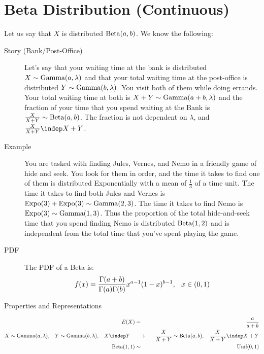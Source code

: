 \documentclass[11pt]{article}
\begin{document}
\section*{Beta Distribution (Continuous)}
\begin{description}
\item Let us say that $X$ is distributed $\textrm{Beta}(a, b)$. We know the following:
\begin{description}
  \item[Story (Bank/Post-Office)] Let's say that your waiting time at the bank is distributed $X \sim \textrm{Gamma}(a, \lambda)$ and that your total waiting time at the post-office is distributed $Y \sim \textrm{Gamma}(b, \lambda)$. You visit both of them while doing errands. Your total waiting time at both is $X + Y \sim \textrm{Gamma}(a + b, \lambda)$ and the fraction of your time that you spend waiting at the Bank is $\frac{X}{X+Y} \sim \textrm{Beta}(a, b)$. The fraction is not dependent on $\lambda$, and $\frac{X}{X+Y} \indep X + Y$.
  \item[Example] You are tasked with finding Jules, Vernes, and Nemo in a friendly game of hide and seek. You look for them in order, and the time it takes to find one of them is distributed Exponentially with a mean of $\frac{1}{3}$ of a time unit. The time it takes to find both Jules and Vernes is $\textrm{Expo}(3) + \textrm{Expo}(3) \sim \textrm{Gamma}(2, 3)$. The time it takes to find Nemo is $\textrm{Expo}(3) \sim \textrm{Gamma}(1, 3)$. Thus the proportion of the total hide-and-seek time that you spend finding Nemo is distributed $\textrm{Beta}(1, 2)$ and is independent from the total time that you've spent playing the game.
  \item[PDF] The PDF of a Beta is:
    \begin{eqnarray*}
    f(x) = \frac{\Gamma(a+b)}{\Gamma(a)\Gamma(b)}x^{a-1}(1-x)^{b-1},
    \hspace{.1 in}
    x \in (0, 1)
    \end{eqnarray*}
  \item[Properties and Representations]
\end{description}
\end{description}
\vspace{-.4 cm}
  \begin{eqnarray*}
    E(X) &=& \frac{a}{a + b} \\
    X \sim \Gam(a, \lambda), \hspace{.3cm} Y \sim \Gam(b, \lambda), \hspace{.3cm} X\indep Y \hspace{.3cm} &\longrightarrow& \hspace{.3cm} \frac{X}{X + Y} \sim \Beta(a, b), \hspace{.3cm} \frac{X}{X + Y} \indep X + Y \\
    \Beta(1, 1) &\sim& \Unif(0, 1)
  \end{eqnarray*}
\end{document}
